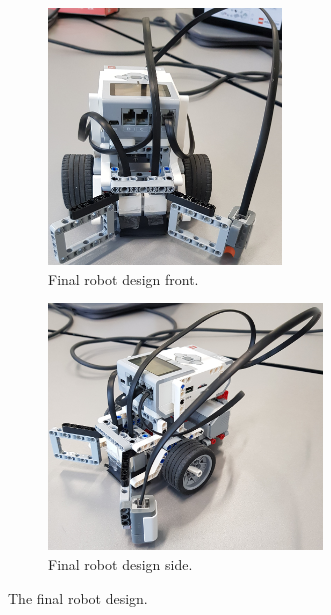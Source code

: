 \documentclass[../report.tex]{subfiles}
\begin{document}
\begin{figure}[H]
    \centering
    \begin{subfigure}[t]{0.48\textwidth}
        \centering
        \includegraphics[width=0.68\textwidth]{figures/robot_design/final_robot_design_front.jpg}
        \caption{Final robot design front.}
        \label{fig:final_robot_design_it_front}
    \end{subfigure}
    \hfill
    \begin{subfigure}[t]{0.48\textwidth}
        \centering
        \includegraphics[width=0.8\textwidth]{figures/robot_design/final_robot_design_side.jpg}
        \caption{Final robot design side.}
        \label{fig:final_robot_design_it_side}
    \end{subfigure}
    \caption{The final robot design.}
    \label{fig:final_robot_design_it}
\end{figure}
\end{document}
